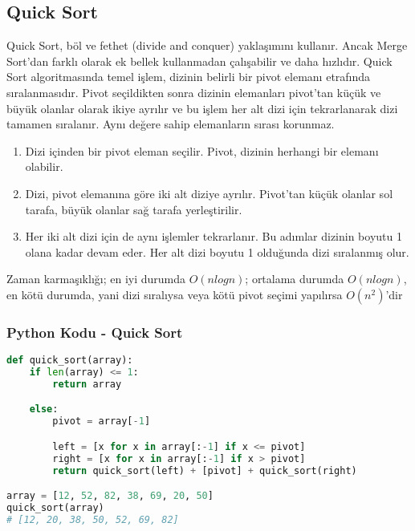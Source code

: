 \newpage

\subsection{Quick Sort}

Quick Sort, böl ve fethet (divide and conquer) yaklaşımını kullanır. Ancak Merge Sort'dan farklı olarak ek bellek kullanmadan çalışabilir ve daha hızlıdır. Quick Sort algoritmasında temel işlem, dizinin belirli bir pivot elemanı etrafında sıralanmasıdır. Pivot seçildikten sonra dizinin elemanları pivot'tan küçük ve büyük olanlar olarak ikiye ayrılır ve bu işlem her alt dizi için tekrarlanarak dizi tamamen sıralanır. Aynı değere sahip elemanların sırası korunmaz.

\begin{enumerate}
    \item Dizi içinden bir pivot eleman seçilir. Pivot, dizinin herhangi bir elemanı olabilir.
    \item Dizi, pivot elemanına göre iki alt diziye ayrılır. Pivot'tan küçük olanlar sol tarafa, büyük olanlar sağ tarafa yerleştirilir.
    \item Her iki alt dizi için de aynı işlemler tekrarlanır. Bu adımlar dizinin boyutu 1 olana kadar devam eder. Her alt dizi boyutu 1 olduğunda dizi sıralanmış olur.
\end{enumerate}

Zaman karmaşıklığı; en iyi durumda $O(nlogn)$; ortalama durumda $O(nlogn)$, en kötü durumda, yani dizi sıralıysa veya kötü pivot seçimi yapılırsa $O(n^2)$'dir

\subsubsection{Python Kodu - Quick Sort}

\begin{lstlisting}[language=Python]
def quick_sort(array):
    if len(array) <= 1:
        return array

    else:
        pivot = array[-1]

        left = [x for x in array[:-1] if x <= pivot]
        right = [x for x in array[:-1] if x > pivot]
        return quick_sort(left) + [pivot] + quick_sort(right)

array = [12, 52, 82, 38, 69, 20, 50]
quick_sort(array)
# [12, 20, 38, 50, 52, 69, 82]
\end{lstlisting}

\newpage

